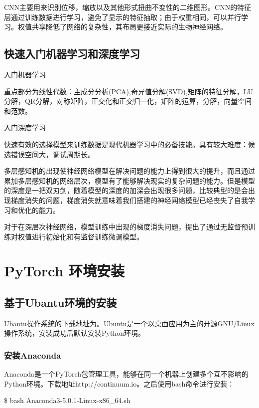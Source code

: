 \documentclass[openbib]{article}
\begin{document}
	CNN主要用来识别位移，缩放以及其他形式扭曲不变性的二维图形。CNN的特征层通过训练数据进行学习，避免了显示的特征抽取；由于权重相同，可以并行学习。权值共享降低了网络的复杂性，其布局更接近实际的生物神经网络。
	
	
	\subsection{快速入门机器学习和深度学习}
	
	\begin{center}
		入门机器学习
	\end{center}

	重点部分为线性代数：主成分分析(PCA),奇异值分解(SVD),矩阵的特征分解，LU分解，QR分解，对称矩阵，正交化和正交归一化，矩阵的运算，分解，向量空间和范数。
	
	\begin{center}
		入门深度学习
	\end{center}

	快速有效的选择模型来训练数据是现代机器学习中的必备技能。具有较大难度：候选错误空间大，调试周期长。
	
	多层感知机的出现使神经网络模型在解决问题的能力上得到很大的提升，而且通过累加多层感知机的网络层次，模型有了能够解决现实的复杂问题的能力。但是模型的深度是一把双刃剑，随着模型的深度的加深会出现很多问题，比较典型的是会出现梯度消失的问题，梯度消失就意味着我们搭建的神经网络模型已经丧失了自我学习和优化的能力。
	
	对于在深层次神经网络，模型训练中出现的梯度消失问题，提出了通过无监督预训练对权值进行初始化和有监督训练微调模型。
	
\section{PyTorch 环境安装}
	\subsection{基于Ubantu环境的安装}
	Ubantu操作系统的下载地址为。Ubuntu是一个以桌面应用为主的开源GNU/Linux操作系统，安装成功后默认安装Python环境。
	\subsubsection{安装Anaconda}
	Anaconda是一个PyTorch包管理工具，能够在同一个机器上创建多个互不影响的Python环境。下载地址http://continuum.io。之后使用bash命令进行安装：
	
	\$ bash Anaconda3-5.0.1-Linux-x86\_64.sh
	
\end{document}
